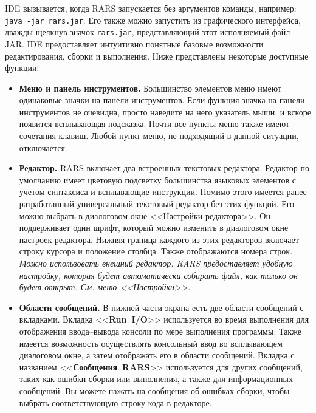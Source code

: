 IDE вызывается, когда RARS запускается без аргументов команды, например: \verb|java -jar rars.jar|. Его также можно запустить из графического интерфейса, дважды щелкнув значок \verb|rars.jar|, представляющий этот исполняемый файл JAR. IDE предоставляет интуитивно понятные базовые возможности редактирования, сборки и выполнения. Ниже представлены некоторые доступные функции:
\begin{itemize}
    \item \textbf{Меню и панель инструментов.} Большинство элементов меню имеют одинаковые значки на панели инструментов. Если функция значка на панели инструментов не очевидна, просто наведите на него указатель мыши, и вскоре появится всплывающая подсказка. Почти все пункты меню также имеют сочетания клавиш. Любой пункт меню, не подходящий в данной ситуации, отключается.
    \item \textbf{Редактор.} RARS включает два встроенных текстовых редактора. Редактор по умолчанию имеет цветовую подсветку большинства языковых элементов с учетом синтаксиса и всплывающие инструкции. Помимо этого имеется ранее разработанный универсальный текстовый редактор без этих функций. Его можно выбрать в диалоговом окне <<Настройки редактора>>. Он поддерживает один шрифт, который можно изменить в диалоговом окне настроек редактора. Нижняя граница каждого из этих редакторов включает строку курсора и положение столбца. Также отображаются номера строк. \textit{Можно использовать внешний редактор. RARS предоставляет удобную настройку, которая будет автоматически собирать файл, как только он будет открыт. См. меню <<Настройки>>.}
    \item \textbf{Области сообщений.} В нижней части экрана есть две области сообщений с вкладками. Вкладка <<\textbf{Run~I/O}>> используется во время выполнения для отображения ввода--вывода консоли по мере выполнения программы. Также имеется возможность осуществлять консольный ввод во всплывающем диалоговом окне, а затем отображать его в области сообщений. Вкладка с названием <<\textbf{Сообщения~RARS}>> используется для других сообщений, таких как ошибки сборки или выполнения, а также для информационных сообщений. Вы можете нажать на сообщения об ошибках сборки, чтобы выбрать соответствующую строку кода в редакторе.


\end{itemize}
